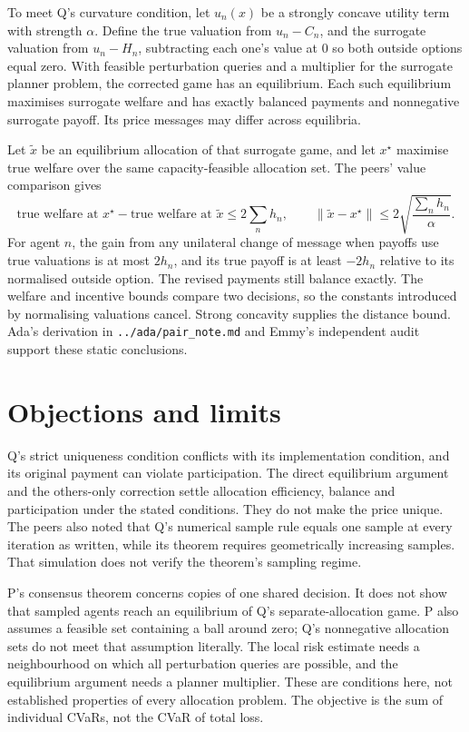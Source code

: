 \documentclass{article}
\begin{document}
To meet Q's curvature condition, let \(u_n(x)\) be a strongly concave utility term with strength \(\alpha\). Define the
true valuation from \(u_n-C_n\), and the surrogate valuation from \(u_n-H_n\), subtracting each one's value at \(0\) so
both outside options equal zero. With feasible perturbation queries and a multiplier for the surrogate planner problem,
the corrected game has an equilibrium. Each such equilibrium maximises surrogate welfare and has exactly balanced
payments and nonnegative surrogate payoff. Its price messages may differ across equilibria.

Let \(\widetilde x\) be an equilibrium allocation of that surrogate game, and let \(x^\star\) maximise true welfare
over the same capacity-feasible allocation set. The peers' value comparison gives
\[
\text{true welfare at }x^\star-\text{true welfare at }\widetilde x
\leq 2\sum_n h_n,
\qquad
\|\widetilde x-x^\star\|\leq
2\sqrt{\frac{\sum_n h_n}{\alpha}}.
\]
For agent \(n\), the gain from any unilateral change of message when payoffs use true valuations is at most \(2h_n\),
and its true payoff is at least \(-2h_n\) relative to its normalised outside option. The revised payments still balance
exactly. The welfare and incentive bounds compare two decisions, so the constants introduced by normalising valuations
cancel. Strong concavity supplies the distance bound. Ada's derivation in \texttt{../ada/pair\_note.md} and Emmy's
independent audit support these static conclusions.

\section{Objections and limits}

Q's strict uniqueness condition conflicts with its implementation condition, and its original payment can violate
participation. The direct equilibrium argument and the others-only correction settle allocation efficiency, balance and
participation under the stated conditions. They do not make the price unique. The peers also noted that Q's numerical
sample rule equals one sample at every iteration as written, while its theorem requires geometrically increasing
samples. That simulation does not verify the theorem's sampling regime.

P's consensus theorem concerns copies of one shared decision. It does not show that sampled agents reach an equilibrium
of Q's separate-allocation game. P also assumes a feasible set containing a ball around zero; Q's nonnegative
allocation sets do not meet that assumption literally. The local risk estimate needs a neighbourhood on which all
perturbation queries are possible, and the equilibrium argument needs a planner multiplier. These are conditions here,
not established properties of every allocation problem. The objective is the sum of individual CVaRs, not the CVaR of
total loss.
\end{document}

